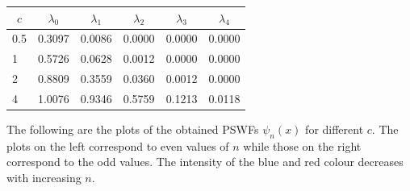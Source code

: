\documentclass[a4paper,10pt]{article}
\begin{document}
\begin{center}
\begin{tabular}{|c|c|c|c|c|c|}
\hline
$c$ & $\lambda_0$ & $\lambda_1$ & $\lambda_2$ & $\lambda_3$ & $\lambda_4$ \\
\hline
\multicolumn{1}{|l|}{0.5} & \multicolumn{1}{l|}{0.3097} & \multicolumn{1}{l|}{0.0086} & \multicolumn{1}{l|}{0.0000} & \multicolumn{1}{l|}{0.0000} & \multicolumn{1}{l|}{0.0000} \\ \hline
\multicolumn{1}{|l|}{1}   & \multicolumn{1}{l|}{0.5726} & \multicolumn{1}{l|}{0.0628} & \multicolumn{1}{l|}{0.0012} & \multicolumn{1}{l|}{0.0000} & \multicolumn{1}{l|}{0.0000} \\ \hline
\multicolumn{1}{|l|}{2}   & \multicolumn{1}{l|}{0.8809} & \multicolumn{1}{l|}{0.3559} & \multicolumn{1}{l|}{0.0360} & \multicolumn{1}{l|}{0.0012} & \multicolumn{1}{l|}{0.0000} \\ \hline
\multicolumn{1}{|l|}{4}   & \multicolumn{1}{l|}{1.0076} & \multicolumn{1}{l|}{0.9346} & \multicolumn{1}{l|}{0.5759} & \multicolumn{1}{l|}{0.1213} & \multicolumn{1}{l|}{0.0118} \\ \hline

\end{tabular}
\end{center}

The following are the plots of the obtained PSWFs $\psi_n(x)$ for different $c$. The plots on the left correspond to even values of $n$ while those on the right correspond to the odd values. The intensity of the blue and red colour decreases with increasing $n$.
\end{document}
